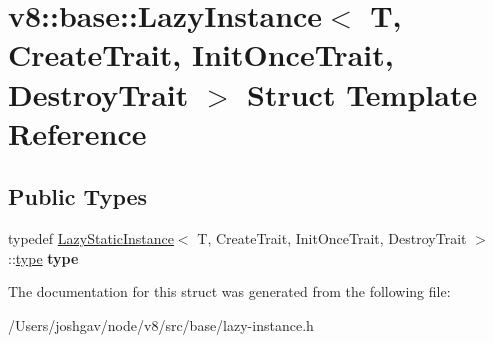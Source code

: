 \hypertarget{structv8_1_1base_1_1_lazy_instance}{}\section{v8\+:\+:base\+:\+:Lazy\+Instance$<$ T, Create\+Trait, Init\+Once\+Trait, Destroy\+Trait $>$ Struct Template Reference}
\label{structv8_1_1base_1_1_lazy_instance}
\subsection*{Public Types}
\begin{DoxyCompactItemize}
\item 
typedef \hyperlink{structv8_1_1base_1_1_lazy_static_instance}{Lazy\+Static\+Instance}$<$ T, Create\+Trait, Init\+Once\+Trait, Destroy\+Trait $>$\+::\hyperlink{structv8_1_1base_1_1_lazy_instance_impl}{type} {\bfseries type}\hypertarget{structv8_1_1base_1_1_lazy_instance_a91c6b8e8682989eb6b86fd3b6cb5328e}{}\label{structv8_1_1base_1_1_lazy_instance_a91c6b8e8682989eb6b86fd3b6cb5328e}

\end{DoxyCompactItemize}


The documentation for this struct was generated from the following file\+:\begin{DoxyCompactItemize}
\item 
/\+Users/joshgav/node/v8/src/base/lazy-\/instance.\+h\end{DoxyCompactItemize}
